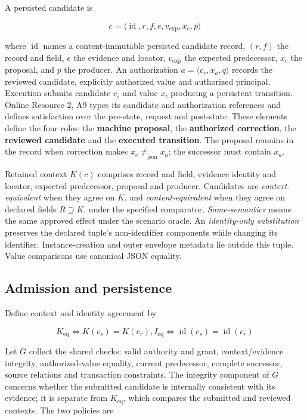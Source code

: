 \documentclass[pdflatex,sn-basic]{sn-jnl}
\begin{document}
A persisted candidate is

\[
c = \langle \operatorname{id}, r, f, e, v_{\mathrm{exp}}, x_c, p\rangle
\]

where \(\operatorname{id}\) names a content-immutable persisted candidate record, \((r,f)\) the record and field, \(e\) the evidence and locator, \(v_{\mathrm{exp}}\) the expected predecessor, \(x_c\) the proposal, and \(p\) the producer. An authorization \(a = \langle c_r, x_a, q\rangle\) records the reviewed candidate, explicitly authorized value and authorized principal. Execution submits candidate \(c_s\) and value \(x\), producing a persistent transition. Online Resource 2, A9 types its candidate and authorization references and defines satisfaction over the pre-state, request and post-state. These elements define the four roles: the \textbf{machine proposal}, the \textbf{authorized correction}, the \textbf{reviewed candidate} and the \textbf{executed transition}. The proposal remains in the record when correction makes \(x_c \ne _{\mathrm{json}} x_a\); the successor must contain \(x_a\).

Retained context \(K(c)\) comprises record and field, evidence identity and locator, expected predecessor, proposal and producer. Candidates are \emph{context-equivalent} when they agree on \(K\), and \emph{content-equivalent} when they agree on declared fields \(R\supseteq K\), under the specified comparator. \emph{Same-semantics} means the same approved effect under the scenario oracle. An \emph{identity-only substitution} preserves the declared tuple's non-identifier components while changing its identifier. Instance-creation and outer envelope metadata lie outside this tuple. Value comparisons use canonical JSON equality.

\subsection{Admission and persistence}\label{admission-and-persistence}

Define context and identity agreement by

\[
K_{\mathrm{eq}} \Leftrightarrow  K(c_s) = K(c_r),   I_{\mathrm{eq}} \Leftrightarrow  \operatorname{id}(c_s) = \operatorname{id}(c_r)
\]

Let \(G\) collect the shared checks: valid authority and grant, context/evidence integrity, authorized-value equality, current predecessor, complete successor, source relations and transaction constraints. The integrity component of \(G\) concerns whether the submitted candidate is internally consistent with its evidence; it is separate from \(K_{\mathrm{eq}}\), which compares the submitted and reviewed contexts. The two policies are
\end{document}
